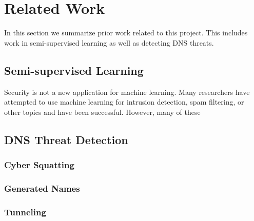 \section{Related Work}

In this section we summarize prior work related to this project.
This includes work in semi-supervised learning as well as detecting DNS threats.

\subsection{Semi-supervised Learning}

Security is not a new application for machine learning.
Many researchers have attempted to use machine learning for intrusion detection, spam filtering,
or other topics and have been successful.
However, many of these 

\subsection{DNS Threat Detection}

\subsubsection{Cyber Squatting}

\subsubsection{Generated Names}

\subsubsection{Tunneling}

